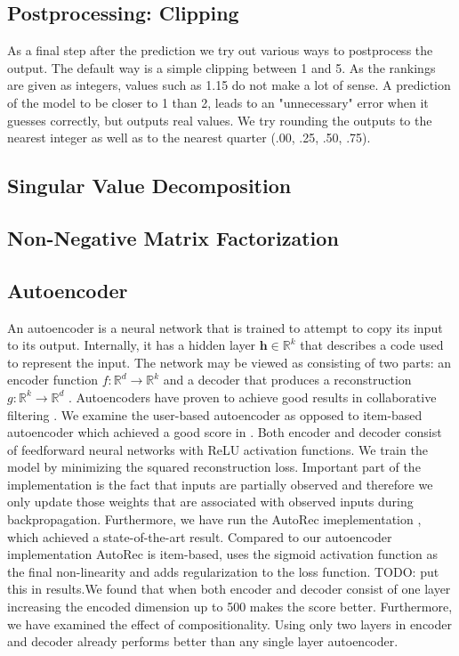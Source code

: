 \documentclass[10pt,conference,compsocconf]{IEEEtran}
\begin{document}
    \subsection{Postprocessing: Clipping}
    As a final step after the prediction we try out various ways to postprocess the output.
    The default way is a simple clipping between 1 and 5.
    As the rankings are given as integers, values such as 1.15 do not make a lot of sense.
    A prediction of the model to be closer to 1 than 2, leads to an "unnecessary" error when it guesses correctly, but outputs real values.
    We try rounding the outputs to the nearest integer as well as to the nearest quarter (.00, .25, .50, .75).

    \subsection{Singular Value Decomposition}

    \subsection{Non-Negative Matrix Factorization}

    \subsection{Autoencoder}
    An autoencoder is a neural network that is trained to attempt to copy its input to its output.
    Internally, it has a hidden layer $\textbf{h} \in \mathbb{R}^k$ that describes a code used to represent the input.
    The network may be viewed as consisting of two parts: an encoder function $f: \mathbb{R} ^d \rightarrow \mathbb{R} ^k$ and a
    decoder that produces a reconstruction $g: \mathbb{R} ^k \rightarrow \mathbb{R} ^d$ \cite{Goodfellow-et-al-2016}. Autoencoders
    have proven to achieve good results in collaborative filtering \cite{inproceedings}. We examine the user-based
    autoencoder as opposed to item-based autoencoder which achieved a good score in \cite{inproceedings}. Both encoder
    and decoder consist of feedforward neural networks with ReLU activation functions. We train the model by minimizing
    the squared reconstruction loss. Important part of the implementation is the fact that inputs are partially observed
    and therefore we only update those weights that are associated with observed inputs during backpropagation. Furthermore, we have run the AutoRec imeplementation \cite{inproceedings}, which achieved a state-of-the-art result. Compared to our autoencoder implementation AutoRec is item-based, uses the sigmoid activation function as the final non-linearity and adds regularization to the loss function. 
    TODO: put this in results.We found that when both encoder and decoder consist of one layer increasing the encoded dimension up to 500 makes
    the score better. Furthermore, we have examined the effect of compositionality. Using only two layers in encoder
    and decoder already performs better than any single layer autoencoder.
\end{document}
